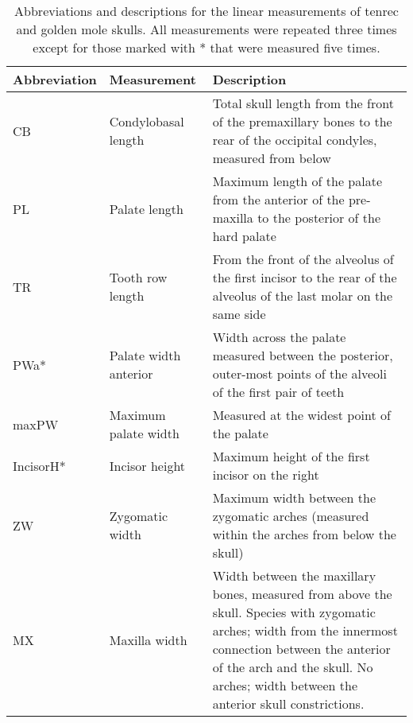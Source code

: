 \begin{center}
\begin{longtable} {lp{}p{}}
\caption[Skull measurements] {Abbreviations and descriptions for the linear measurements of tenrec and golden mole skulls. All measurements were repeated three times except for those marked with * that were measured five times.}\\
\hline
\textbf{Abbreviation} & \textbf{Measurement} & \textbf{Description}\\
\hline
CB & Condylobasal length & Total skull length from the front of the premaxillary  bones to the rear of the occipital condyles, measured from below\\
PL & Palate length & Maximum length of the palate from the anterior of the pre-maxilla to the posterior of the hard palate\\
TR & Tooth row length & From the front of the alveolus of the first incisor to the rear of the alveolus of the last molar on the same side\\
PWa* & Palate width anterior & Width across the palate measured between the posterior, outer-most points of the alveoli of the first pair of teeth\\
maxPW & Maximum palate width & Measured at the widest point of the palate\\
IncisorH* & Incisor height & Maximum height of the first incisor on the right\\
ZW & Zygomatic width & Maximum width between the zygomatic arches (measured within the arches from below the skull)\\
MX & Maxilla width & Width between the maxillary bones, measured from above the skull. Species with zygomatic arches; width from the innermost connection between the anterior of the arch and the skull. No arches; width between the anterior skull constrictions.\\ 

\end{longtable}
\end{center}
